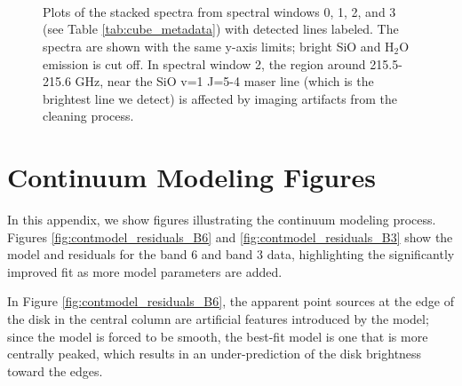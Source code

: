 \documentclass[twocolumn]{aastex61}
\newcommand{\water}{H$_{2}$O\xspace}		%
\begin{document}



\begin{figure}[!htp]
\vspace{0.001mm} \\
\vspace{0.001mm} \\
\vspace{0.001mm} \\
\vspace{0.001mm}
\caption{Plots of the stacked spectra from spectral windows 0, 1, 2, and 3 (see Table \ref{tab:cube_metadata})
with detected lines labeled.  The spectra are shown with the same y-axis limits; bright SiO and \water
emission is cut off.  In spectral window 2, the region around 215.5-215.6 GHz, near the SiO v=1 J=5-4
maser line (which is the brightest line we detect) is affected by imaging artifacts from the cleaning
process.}
\label{fig:stackplots_labeled}
\end{figure}


\section{Continuum Modeling Figures}
\label{appendix:contmodel}
In this appendix, we show figures illustrating the continuum modeling process.
Figures \ref{fig:contmodel_residuals_B6} and \ref{fig:contmodel_residuals_B3}
show the model and residuals for the band 6 and band 3 data, highlighting the
significantly improved fit as more model parameters are added.

In Figure \ref{fig:contmodel_residuals_B6}, the apparent point sources at the
edge of the disk in the central column are artificial features introduced by
the model; since the model is forced to be smooth, the best-fit model is one
that is more centrally peaked, which results in an under-prediction of the disk
brightness toward the edges.  
\end{document}
